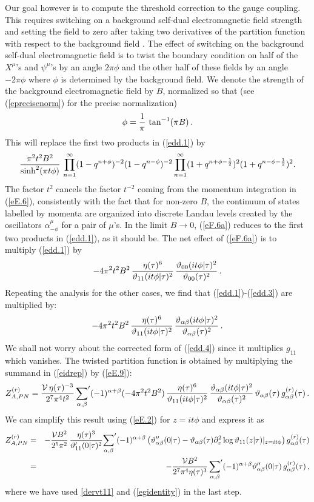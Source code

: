 \documentclass[12pt,a4paper]{article}
\newcommand{\be}{\begin{equation}}
\newcommand{\ee}{\end{equation}}
\newcommand{\ben}{\begin{eqnarray}\displaystyle}
\newcommand{\een}{\end{eqnarray}}
\newcommand{\refb}[1]{(\ref{#1})}
\newcommand{\p}{\partial}
\def\({\left(}
\def\){\right)}
\newcommand{\non}{\nonumber}
\newcommand{\vt}{\vartheta}
\newcommand{\VV}{{\cal V}}
\def\gr{g^{(r)}}
\def\Zr{Z^{(r)}}
\begin{document}
Our goal however is to compute the threshold correction to the gauge coupling.
This requires switching on a background self-dual electromagnetic field strength and
setting the field to zero after taking two derivatives of the partition function with respect
to the background field \cite{Lust:2003ky}. The effect of switching on the background self-dual electromagnetic
field is to twist the boundary condition on half of the $X^\mu$'s and $\psi^\mu$'s by an
angle $2\pi\phi$ and the other half of these fields by an angle
$-2\pi\phi$ where $\phi$ is determined by the background field.
We denote the strength of the background electromagnetic field by $B$, normalized so that
(see \refb{eprecisenorm} for the precise normalization)
\be \label{ephiB}
\phi = {1\over \pi} \, \tan^{-1}(\pi B)\, .
\ee
This will replace the first two products in \refb{edd.1} by
\be\label{eF.6a}
{\pi^2 t^2 B^2\over \sinh^2(\pi t\phi)} \,
\prod_{n=1}^\infty (1-q^{n+\phi})^{-2}  (1-q^{n-\phi})^{-2}
\prod_{n=1}^\infty (1+q^{n+\phi-{1\over 2}})^2 (1+q^{n-\phi-{1\over 2}})^2.
\ee
The factor $t^2$ cancels the factor $t^{-2}$
coming from the momentum integration in  \refb{eE.6}, consistently with the fact that for non-zero $B$, the continuum of states
labelled by momenta are organized into discrete Landau levels
created by the oscillators $\alpha^\mu_{-\phi}$
for a pair of $\mu$'s. In the limit $B\to 0$, \refb{eF.6a} reduces to the first two products in \refb{edd.1}, as it should be.
The net effect of \refb{eF.6a} is to multiply \refb{edd.1} by
\be
-4 \pi^2 t^2 B^2 \,
{\eta(\tau)^6\over \vt_{11}(i t\phi|\tau)^2}\, {\vt_{00}(it\phi|\tau)^2\over \vt_{00}(\tau)^2}\, .
\ee
Repeating the analysis for the other cases, we find
that \refb{edd.1}-\refb{edd.3} are multiplied by:
\be\label{eE.9}
-4 \pi^2 t^2 B^2 \,
{\eta(\tau)^6\over \vt_{11}(i t\phi|\tau)^2} \,
{\vt_{\alpha\beta}(it\phi|\tau)^2\over \vt_{\alpha\beta}(\tau)^2}\, .
\ee
We shall not worry about the corrected form of
\refb{edd.4} since it multiplies $g_{11}$ which vanishes.
The twisted partition function is obtained by multiplying the summand in \refb{eidrep} by
\refb{eE.9}:
\be\label{eE99pre}
\Zr_{A,PN}=\frac{\VV\,\eta(\tau)^{-3}}{2^{7} \pi^{4} t^{2}}\, {\sum_{\alpha,\beta}}' (-1)^{\alpha+\beta}
(-4 \pi^2 t^2 B^2) \,
{\eta(\tau)^6\over \vt_{11}(i t\phi|\tau)^2} \,
{\vt_{\alpha\beta}(it\phi|\tau)^2\over \vt_{\alpha\beta}(\tau)^2}\,
\vt_{\alpha\beta}(\tau) \,\gr_{\alpha\beta}(\tau)\, .
\ee
We can simplify this result using \refb{eE.2} for $z=it\phi$ and express it as
\ben\label{eE99}
\Zr_{A,PN}&=& -\frac{\VV B^2 }{ 2^{5} \pi^{2}} \,
{\eta(\tau)^{3}\over \vt'_{11}(0|\tau)^2}
{\sum_{\alpha,\beta}}' (-1)^{\alpha+\beta}
\(\vt''_{\alpha\beta}(0|\tau) -\vt_{\alpha\beta}(\tau) \p_z^2 \log \vt_{11}(z|\tau)|_{z=it\phi}\)
\gr_{\alpha\beta}(\tau) \non\\ &=&
-\frac{\VV B^2}{2^{7} \pi^{4}\eta(\tau)^{3}} \,
{\sum_{\alpha,\beta}}' (-1)^{\alpha+\beta}
\vt''_{\alpha\beta}(0|\tau)\,  \gr_{\alpha\beta}(\tau)\, ,
\een
where we have used \eqref{dervt11} and \refb{egidentity} in the last step.
\end{document}
